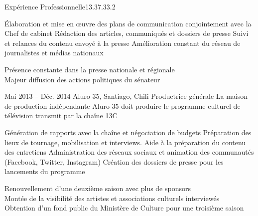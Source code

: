 \documentclass[30pt, french]{tccv}
\begin{document}
\begin{upshape}
\begin{flat_frame}{Expérience Professionnelle}{13.3}{7.3}{3.2}{}
\begin{eventlist}
    \setlength{\parskip}{-10pt}
    \begin{itemize}
      \setlength\itemsep{-3pt} 
      \cvitem[\checkmark] Élaboration et mise en œuvre des plans de communication conjointement avec la Chef de cabinet
      \cvitem[\checkmark] Rédaction des articles, communiqués et dossiers de presse
      \cvitem[\checkmark] Suivi et relances du contenu envoyé à la presse
      \cvitem[\checkmark] Amélioration constant du réseau de journalistes et médias nationaux
      
      
      
      
    \end{itemize}     
 Présence constante dans la presse nationale et régionale  \\
\mission{}            Majeur diffusion des actions politiques du sénateur
    
    
    
\setlength{\parskip}{0pt}        
\item{Mai 2013 -- Déc. 2014}
     {Aluro 35, Santiago, Chili}
     {Productrice générale}
     \fontsize{9pt}{1em}\color{text}\bodyfontlight\upshape\selectfont
%
 La maison de production indépendante Aluro 35 doit produire le programme culturel de télévision  transmit par la chaîne 13C \\
    
    \setlength{\parskip}{-10pt}
    \begin{itemize}
      \setlength\itemsep{-3pt} 
      \cvitem[\checkmark] Génération de rapports avec la chaîne et négociation de budgets                       
      \cvitem[\checkmark] Préparation des lieux de tournage, mobilisation et interviews. Aide à la préparation du contenu des entretiens 
      \cvitem[\checkmark] Administration des réseaux sociaux et animation des communautés (Facebook, Twitter, Instagram)                 
      \cvitem[\checkmark] Création des dossiers de presse pour les lancements du programme                                             
    \end{itemize}     
 Renouvellement d'une deuxième saison avec plus de sponsors \\
\mission{}	     Montée de la visibilité des artistes et associations culturels interviewés \\
\mission{}           Obtention d’un fond public du Ministère de Culture pour une troisième saison  \\





\end{eventlist}
\end{flat_frame}
\end{upshape}
\end{document}
